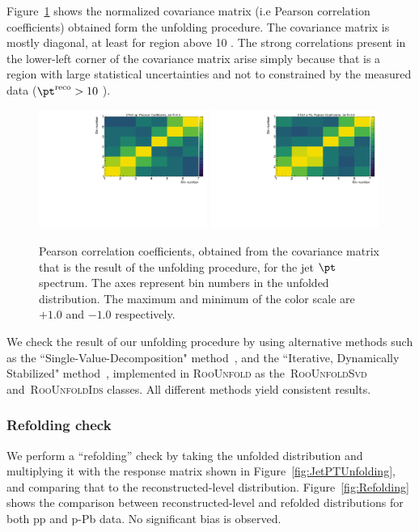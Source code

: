Figure~\ref{fig:PearsonMatrix} shows the normalized covariance matrix (i.e Pearson correlation coefficients) obtained form the unfolding procedure. The covariance matrix is mostly diagonal, at least for region above 10 \GeVc. The strong correlations present in the lower-left corner of the covariance matrix arise simply because that is a region with large statistical uncertainties and not to constrained by the measured data ({$\pt^{\mathrm{reco}}>10$} \GeVc).
\begin{figure}
\center
\includegraphics[width=0.49\textwidth]{JetResponse/Pearsonpp}
\includegraphics[width=0.49\textwidth]{JetResponse/PearsonpPb}
\label{fig:PearsonMatrix}
\caption{Pearson correlation coefficients, obtained from the covariance matrix that is the result of the unfolding procedure, for the jet $\pt$ spectrum. The axes represent bin numbers in the unfolded distribution. The maximum and minimum of the color scale are $+1.0$ and $-1.0$ respectively.}
\end{figure}

We check the result of our unfolding procedure by using alternative methods such as the ``Single-Value-Decomposition" method~\cite{Hocker:1995kb}, and the ``Iterative, Dynamically Stabilized" method~\cite{Malaescu:2011yg}, implemented in \textsc{RooUnfold} as the~\textsc{RooUnfoldSvd} and~\textsc{RooUnfoldIds} classes. All different methods yield consistent results. 

\subsubsection{Refolding check}
We perform a ``refolding'' check by taking the unfolded distribution and multiplying it with the response matrix shown in Figure~\ref{fig:JetPTUnfolding}, and comparing that to the reconstructed-level distribution. Figure~\ref{fig:Refolding} shows the comparison between reconstructed-level and refolded distributions for both pp and p-Pb data. No significant bias is observed. 

